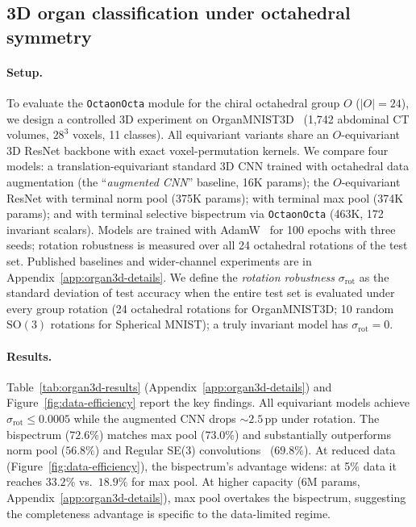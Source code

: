 \documentclass{article}
\theoremstyle{definition}
\theoremstyle{remark}
\newcommand{\SO}{\mathrm{SO}}
\theoremstyle{definition}
\begin{document}
\subsection{3D organ classification under octahedral symmetry}
\label{sec:organ3d}

\paragraph{Setup.} To evaluate the \texttt{OctaonOcta} module for the chiral octahedral group
$O$ ($|O|=24$), we design a controlled 3D experiment on
OrganMNIST3D~\citep{medmnistv2} (1{,}742 abdominal CT volumes, $28^3$
voxels, 11 classes). All equivariant variants share an $O$-equivariant 3D
ResNet backbone with exact voxel-permutation kernels. We compare four models: a translation-equivariant standard 3D CNN trained with
octahedral data augmentation (the ``\emph{augmented CNN}'' baseline,
16K params); the $O$-equivariant ResNet with terminal norm pool
(375K params); with terminal max pool (374K params); and with terminal
selective bispectrum via \texttt{OctaonOcta} (463K, 172 invariant
scalars). Models are trained with AdamW~\citep{loshchilov2019adamw} for
100 epochs with three seeds; rotation robustness is measured over all
24 octahedral rotations of the test set. Published baselines and
wider-channel experiments are in Appendix~\ref{app:organ3d-details}.
We define the \emph{rotation robustness} $\sigma_{\mathrm{rot}}$ as the standard deviation of test accuracy when the entire test set is evaluated under every group rotation (24 octahedral rotations for OrganMNIST3D; 10 random $\SO(3)$ rotations for Spherical MNIST); a truly invariant model has $\sigma_{\mathrm{rot}}=0$.

\paragraph{Results.} Table~\ref{tab:organ3d-results} (Appendix~\ref{app:organ3d-details}) and Figure~\ref{fig:data-efficiency} report the key findings. All equivariant models achieve $\sigma_{\mathrm{rot}}\le 0.0005$
while the augmented CNN drops ${\sim}2.5$\,pp under rotation. The
bispectrum ($72.6\%$) matches max pool ($73.0\%$) and substantially
outperforms norm pool ($56.8\%$) and Regular SE(3)
convolutions~\citep{kuipers2023regular} ($69.8\%$).
At reduced data (Figure~\ref{fig:data-efficiency}), the bispectrum's
advantage widens: at 5\% data it reaches $33.2\%$ vs.\ $18.9\%$ for max
pool. At higher capacity (6M params,
Appendix~\ref{app:organ3d-details}), max pool overtakes the bispectrum,
suggesting the completeness advantage is specific to the data-limited
regime.
\end{document}
